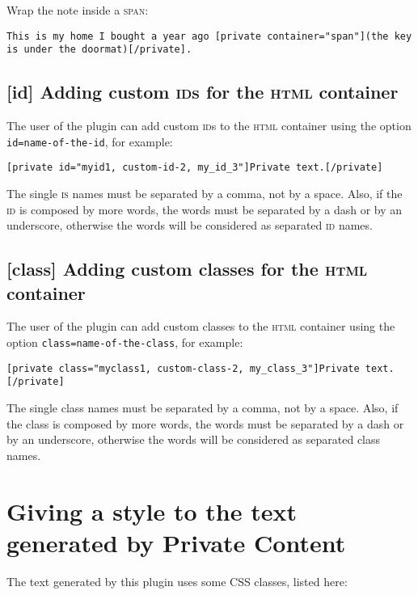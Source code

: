 \documentclass[a4paper,10pt]{article}
\begin{document}
Wrap the note inside a \textsc{span}:

\begin{lstlisting}
This is my home I bought a year ago [private container="span"](the key is under the doormat)[/private].
\end{lstlisting}


\subsection{[id] Adding custom \textsc{id}s for the \textsc{html} container}

The user of the plugin can add custom \textsc{id}s to the \textsc{html} container using the option \verb+id=name-of-the-id+, for example:

\begin{lstlisting}
[private id="myid1, custom-id-2, my_id_3"]Private text.[/private]
\end{lstlisting}

The single \textsc{is} names must be separated by a comma, not by a space. Also, if the \textsc{id} is composed by more words, the words must be separated by a dash or by an underscore, otherwise the words will be considered as separated \textsc{id} names.

\subsection{[class] Adding custom classes for the \textsc{html} container}

The user of the plugin can add custom classes to the \textsc{html} container using the option \verb+class=name-of-the-class+, for example:

\begin{lstlisting}
[private class="myclass1, custom-class-2, my_class_3"]Private text.[/private]
\end{lstlisting}

The single class names must be separated by a comma, not by a space. Also, if the class is composed by more words, the words must be separated by a dash or by an underscore, otherwise the words will be considered as separated class names.

\section{Giving a style to the text generated by Private Content}

The text generated by this plugin uses some CSS classes, listed here:
\end{document}
